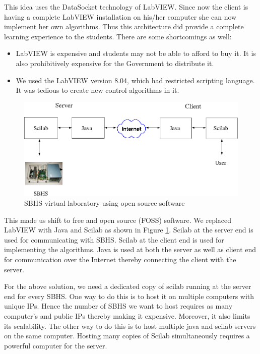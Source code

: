  This idea uses the DataSocket technology of LabVIEW. Since now the
 client is having a complete LabVIEW installation on his/her computer
 she can now implement her own algorithms.  Thus this architecture did
 provide a complete learning experience to the students.  There are
 some shortcomings as well:

\begin{itemize}
\item LabVIEW is expensive and students may not be able to afford to
  buy it.  It is also prohibitively expensive for the Government to
  distribute it.

\item We used the LabVIEW version 8.04, which had restricted scripting
  language.  It was tedious to create new control algorithms in it.
\end{itemize}
\begin{figure}
\includegraphics[width=\linewidth]{vlabs/vlab-3.png}
\caption{SBHS virtual laboratory using open source software}
\label{fig:third}
\end{figure}
This made us shift to free and open source (FOSS) software. We
replaced LabVIEW with Java and Scilab as shown in Figure
\ref{fig:third}. Scilab at the server end is used for communicating
with SBHS. Scilab at the client end is used for implementing the
algorithms. Java is used at both the server as well as client end for
communication over the Internet thereby connecting the client with the
server. 

For the above solution, we need a dedicated copy of scilab running at
the server end for every SBHS. One way to do this is to host it on
multiple computers with unique IPs. Hence the number of SBHS we want
to host requires as many computer's and public IPs thereby making
it expensive. Moreover, it also limits its scalability. The other way
to do this is to host multiple java and scilab servers on the same
computer.  Hosting many copies of Scilab simultaneously requires a
powerful computer for the server.

